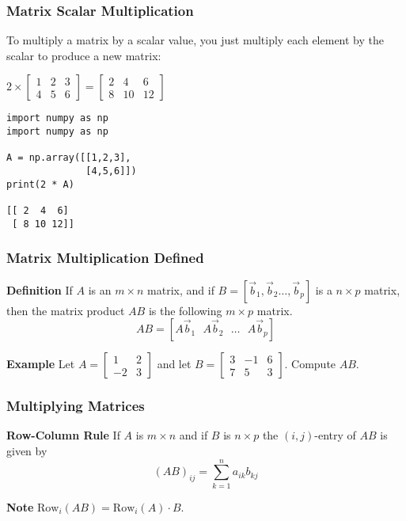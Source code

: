  \begin{frame}[fragile] \frametitle{Matrix Scalar Multiplication}
To multiply a matrix by a scalar value, you just multiply each element by the scalar to produce a new matrix:

$2 \times \begin{bmatrix}1 & 2 & 3 \\4 & 5 & 6\end{bmatrix} = \begin{bmatrix}2 & 4 & 6 \\8 & 10 & 12\end{bmatrix}$


\begin{lstlisting}
import numpy as np
import numpy as np

A = np.array([[1,2,3],
              [4,5,6]])
print(2 * A)

[[ 2  4  6]
 [ 8 10 12]]
\end{lstlisting}

\end{frame}

  \begin{frame}[fragile]\frametitle{Matrix Multiplication Defined}
\textbf{Definition}
If $A$ is an $m \times n$ matrix, and if $B=[\vec{b}_1,\vec{b}_2 \dots, \vec{b}_p]$ is a $n\times p$ matrix, then the matrix product
$AB$ is the following $m \times p$ matrix.
\[
 AB = [ A \vec{b}_1 \ \ \  A \vec{b}_2 \ \ \  \dots 
\ \ \  A \vec{b}_p ]
\]



\textbf{Example}
Let $A =\left[\begin{array}{rr} 1& 2 \\ -2 & 3\end{array}\right]$ and let $B=\left[\begin{array}{rrr} 3 & -1 & 6 \\ 7& 5& 3\end{array}\right]$.  Compute $AB$.

\end{frame}





  \begin{frame}[fragile]\frametitle{Multiplying Matrices}
\textbf{Row-Column Rule}
If $A$ is  $m \times n$ and if $B$ is $n\times p$ the $(i,j)$-entry of $AB$ is 
given by 
\[
 (AB)_{ij} = \sum_{k=1}^n a_{ik} b_{kj}
\]



\textbf{Note}
$\mbox{Row}_i(AB) = \mbox{Row}_i(A) \cdot B$.

\end{frame}


